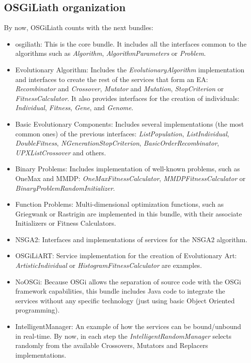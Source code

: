 \subsection{OSGiLiath organization}

By now, OSGiLiath counts with the next bundles:

\begin{itemize}
\item osgiliath: This is the core bundle. It includes all the interfaces common to the algorithms such as {\em Algorithm}, {\em AlgorithmParameters} or {\em Problem}. 
\item Evolutionary Algorithm:  Includes the {\em EvolutionaryAlgorithm} implementation and interfaces to create the rest of the services that form an EA: {\em Recombinator} and {\em Crossover}, {\em Mutator} and {\em Mutation}, {\em StopCriterion} or {\em FitnessCalculator}. It also provides interfaces for the creation of individuals: {\em Individual}, {\em Fitness}, {\em Gene}, and {\em Genome}. 
\item Basic Evolutionary Components: Includes several implementations (the most common ones) of the previous interfaces: {\em ListPopulation}, {\em ListIndividual}, {\em DoubleFitness}, {\em NGenerationStopCriterion}, {\em BasicOrderRecombinator}, {\em UPXListCrossover} and others.
\item Binary Problems: Includes implementation of well-known problems, such as OneMax and MMDP: {\em OneMaxFitnessCalculator}, {\em MMDPFitnessCalculator} or {\em BinaryProblemRandomInitializer}.
\item Function Problems: Multi-dimensional optimization functions, such as Griegwank or Rastrigin are implemented in this bundle, with their associate Initializers or Fitness Calculators.
\item NSGA2: Interfaces and implementations of services for the NSGA2 algorithm.
\item OSGiLiART: Service implementation for the creation of Evolutionary Art: {\em ArtisticIndividual} or {\em HistogramFitnessCalculator} are examples.
\item NoOSGi: Because OSGi allows the separation of source code with the OSGi framework capabilities, this bundle includes Java code to integrate the services without any specific technology (just using basic Object Oriented programming).
\item IntelligentManager: An example of how the services can be bound/unbound in real-time. By now, in each step the {\em IntelligentRandomManager} selects randomly from the available Crossovers, Mutators and Replacers implementations.
\end{itemize}

